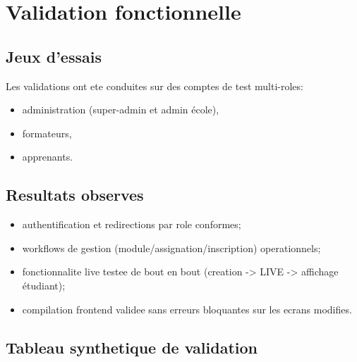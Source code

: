 \documentclass[12pt,a4paper,oneside]{report}
\begin{document}
\section{Validation fonctionnelle}

\subsection{Jeux d'essais}

Les validations ont ete conduites sur des comptes de test multi-roles:
\begin{itemize}
  \item administration (super-admin et admin école),
  \item formateurs,
  \item apprenants.
\end{itemize}

\subsection{Resultats observes}

\begin{itemize}
  \item authentification et redirections par role conformes;
  \item workflows de gestion (module/assignation/inscription) operationnels;
  \item fonctionnalite live testee de bout en bout (creation -> LIVE -> affichage étudiant);
  \item compilation frontend validee sans erreurs bloquantes sur les ecrans modifies.
\end{itemize}

\subsection{Tableau synthetique de validation}
\end{document}
